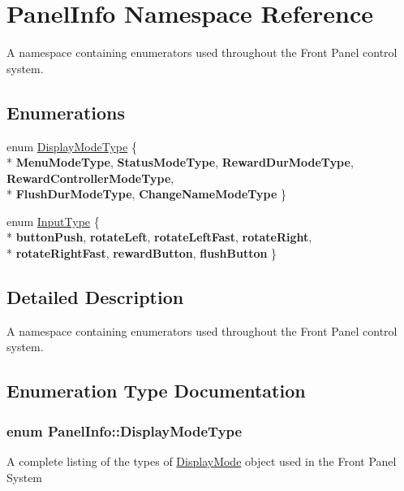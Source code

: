 \hypertarget{namespace_panel_info}{\section{Panel\-Info Namespace Reference}
\label{namespace_panel_info}
}


A namespace containing enumerators used throughout the Front Panel control system.  


\subsection*{Enumerations}
\begin{DoxyCompactItemize}
\item 
enum \hyperlink{namespace_panel_info_adb8b98e092c15e831aa524d39701d565}{Display\-Mode\-Type} \{ \\*
{\bfseries Menu\-Mode\-Type}, 
{\bfseries Status\-Mode\-Type}, 
{\bfseries Reward\-Dur\-Mode\-Type}, 
{\bfseries Reward\-Controller\-Mode\-Type}, 
\\*
{\bfseries Flush\-Dur\-Mode\-Type}, 
{\bfseries Change\-Name\-Mode\-Type}
 \}
\item 
enum \hyperlink{namespace_panel_info_aeeb3b627166cd15c3898f93a1a499c65}{Input\-Type} \{ \\*
{\bfseries button\-Push}, 
{\bfseries rotate\-Left}, 
{\bfseries rotate\-Left\-Fast}, 
{\bfseries rotate\-Right}, 
\\*
{\bfseries rotate\-Right\-Fast}, 
{\bfseries reward\-Button}, 
{\bfseries flush\-Button}
 \}
\end{DoxyCompactItemize}


\subsection{Detailed Description}
A namespace containing enumerators used throughout the Front Panel control system. 

\subsection{Enumeration Type Documentation}
\hypertarget{namespace_panel_info_adb8b98e092c15e831aa524d39701d565}{
\subsubsection[{Display\-Mode\-Type}]{\setlength{\rightskip}{0pt plus 5cm}enum {\bf Panel\-Info\-::\-Display\-Mode\-Type}}}\label{namespace_panel_info_adb8b98e092c15e831aa524d39701d565}
A complete listing of the types of \hyperlink{class_display_mode}{Display\-Mode} object used in the Front Panel System 

